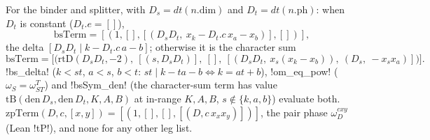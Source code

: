 \begin{definition}\label{def:lean-sym-bsterm}
For the binder and splitter, with $D_s=\mathit{dt}(n.\mathrm{dim})$ and $D_t=\mathit{dt}(n.\mathrm{ph})$: when $D_t$ is constant ($D_t.e=[]$),
\[
\mathrm{bsTerm}=[(1,[],[(D_sD_t,\ x_k-D_t.c\,x_a-x_b)],[])],
\]
the delta $[D_sD_t\mid k-D_t.c\,a-b]$; otherwise it is the character sum
\[
\mathrm{bsTerm}=\bigl[\bigl(\mathrm{rtD}(D_sD_t,-2),\ [(s,D_sD_t)],\ [],\ [(D_sD_t,\ x_s(x_k-x_b)),\ (D_s,\ -x_sx_a)]\bigr)\bigr].
\]
\lean!bs_delta! ($k<st$, $a<s$, $b<t$: $st\mid k-ta-b\iff k=at+b$), \lean!om_eq_pow! ($\omega_S=\omega_{ST}^T$) and \lean!bsSym_den! (the character-sum term has value $\mathrm{tB}(\mathrm{den}\,D_s,\mathrm{den}\,D_t,K,A,B)$ at in-range $K,A,B$, $s\notin\{k,a,b\}$) evaluate both. $\mathrm{zpTerm}(D,c,[x,y])=[(1,[],[],[(D,c\,x_xx_y)])]$, the pair phase $\omega_D^{cxy}$ (Lean \lean!tP!), and $\mathrm{none}$ for any other leg list.
\end{definition}


